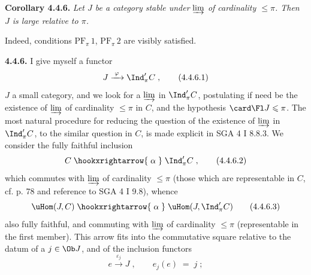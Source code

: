 \textbf{Corollary 4.4.6.} \textit{Let $J$ be a category stable under} $\varinjlim$ \textit{of cardinality $\leqslant \pi$. Then $J$ is large relative to $\pi$.}

Indeed, conditions $\mathrm{PF}_{\pi}\,1$, $\mathrm{PF}_{\pi}\,2$ are visibly satisfied.

\textbf{4.4.6.} I give myself a functor %
\[
J \xrightarrow{\;\varphi\;} \Ind'_\pi C \;, \tag*{(4.4.6.1)}
\]
$J$ a small category, and we look for a $\varinjlim$ in $\Ind'_\pi C$, postulating if need be the existence of $\varinjlim$ of cardinality $\leqslant \pi$ in $C$, and the hypothesis $\card\Fl J \leqslant \pi$. The most natural procedure for reducing the question of the existence of $\varinjlim$ in $\Ind'_\pi C$, to the similar question in $C$, is made explicit in SGA 4 I 8.8.3. We consider the fully faithful inclusion
\[
C \;\hookxrightarrow{\;\alpha\;}\; \Ind'_\pi C \;, \tag*{(4.4.6.2)}
\]
which commutes with $\varinjlim$ of cardinality $\leqslant \pi$ (those which are representable in $C$, cf. p. 78 and reference to SGA 4 I 9.8), whence
\[
\uHom(J,C) \;\hookxrightarrow{\;\alpha\;}\; \uHom(J,\Ind'_\pi C) \tag*{(4.4.6.3)}
\]
also fully faithful, and commuting with $\varinjlim$ of cardinality $\leqslant \pi$ (representable in the first member). This arrow fits into the commutative square relative to the datum of a $j \in \Ob J$, and of the inclusion functors
\[
e \xrightarrow{\;\varepsilon_j\;} J \;, \qquad e_j(e) \;=\; j \;; \tag*{(4.4.6.4)} %
\]
